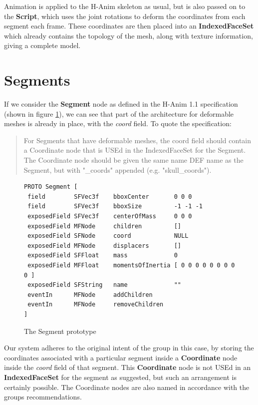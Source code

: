 \documentclass[12pt,oneside,a4paper,titlepage]{article}
\begin{document}
Animation is applied to the H-Anim skeleton as usual, but is also passed on to the {\bf Script}, which uses the joint rotations to deform the coordinates from each segment each frame. These coordinates are then placed into an {\bf IndexedFaceSet} which already contains the topology of the mesh, along with texture information, giving a complete model.

\section{\label{sec:segments}Segments}
If we consider the {\bf Segment} node as defined in the H-Anim 1.1 specification\cite{HANIM:1.1} (shown in figure \ref{fig:segmentproto}), we can see that part of the architecture for deformable meshes is already in place, with the {\it coord} field. To quote the specification:

\begin{quote}
For Segments that have deformable meshes, the coord field should contain a Coordinate node that is USEd in the IndexedFaceSet for the Segment. The Coordinate node should be given the same name DEF name as the Segment, but with "\_coords" appended (e.g. "skull\_coords").
\end{quote}

\begin{figure}[th]
\scriptsize
\begin{verbatim}
PROTO Segment [
 field        SFVec3f    bboxCenter       0 0 0
 field        SFVec3f    bboxSize         -1 -1 -1
 exposedField SFVec3f    centerOfMass     0 0 0
 exposedField MFNode     children         []
 exposedField SFNode     coord            NULL
 exposedField MFNode     displacers       []
 exposedField SFFloat    mass             0
 exposedField MFFloat    momentsOfInertia [ 0 0 0 0 0 0 0 0 0 ]
 exposedField SFString   name             ""
 eventIn      MFNode     addChildren
 eventIn      MFNode     removeChildren
]
\end{verbatim}
\caption{\label{fig:segmentproto} The Segment prototype}
\end{figure}

Our system adheres to the original intent of the group in this case, by storing the coordinates associated with a particular segment inside a {\bf Coordinate} node inside the {\it coord} field of that segment. This {\bf Coordinate} node is not USEd in an {\bf IndexedFaceSet} for the segment as suggested, but such an arrangement is certainly possible. The Coordinate nodes are also named in accordance with the groups recommendations.
\end{document}
